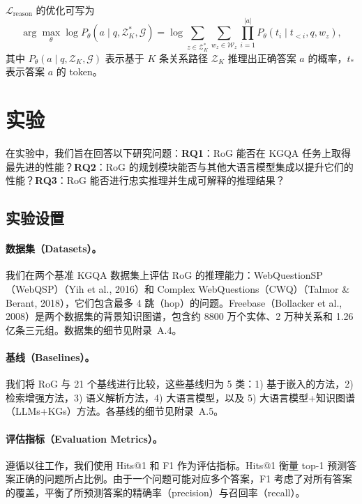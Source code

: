 \documentclass[11pt,UTF8,fontset=fandol]{ctexart}
\begin{document}
$\mathcal{L}_{\text{reason}}$ 的优化可写为
\begin{equation}
\arg\max_\theta \log P_\theta(a \mid q, \mathcal{Z}_K^*, \mathcal{G}) = \log \sum_{z \in \mathcal{Z}_K^*} \sum_{w_z \in \mathcal{W}_z} \prod_{i=1}^{|a|} P_\theta(t_i \mid t_{<i}, q, w_z),
\end{equation}
其中 $P_\theta(a \mid q, \mathcal{Z}_K, \mathcal{G})$ 表示基于 $K$ 条关系路径 $\mathcal{Z}_K$ 推理出正确答案 $a$ 的概率，$t_*$ 表示答案 $a$ 的 token。

\section{实验}

在实验中，我们旨在回答以下研究问题：\textbf{RQ1}：RoG 能否在 KGQA 任务上取得最先进的性能？\textbf{RQ2}：RoG 的规划模块能否与其他大语言模型集成以提升它们的性能？\textbf{RQ3}：RoG 能否进行忠实推理并生成可解释的推理结果？

\subsection{实验设置}

\paragraph{数据集（Datasets）。}
我们在两个基准 KGQA 数据集上评估 RoG 的推理能力：WebQuestionSP（WebQSP）（Yih et al., 2016）和 Complex WebQuestions（CWQ）（Talmor \& Berant, 2018），它们包含最多 4 跳（hop）的问题。Freebase（Bollacker et al., 2008）是两个数据集的背景知识图谱，包含约 8800 万个实体、2 万种关系和 1.26 亿条三元组。数据集的细节见附录~A.4。

\paragraph{基线（Baselines）。}
我们将 RoG 与 21 个基线进行比较，这些基线归为 5 类：1) 基于嵌入的方法，2) 检索增强方法，3) 语义解析方法，4) 大语言模型，以及 5) 大语言模型+知识图谱（LLMs+KGs）方法。各基线的细节见附录~A.5。

\paragraph{评估指标（Evaluation Metrics）。}
遵循以往工作，我们使用 Hits@1 和 F1 作为评估指标。Hits@1 衡量 top-1 预测答案正确的问题所占比例。由于一个问题可能对应多个答案，F1 考虑了对所有答案的覆盖，平衡了所预测答案的精确率（precision）与召回率（recall）。
\end{document}
